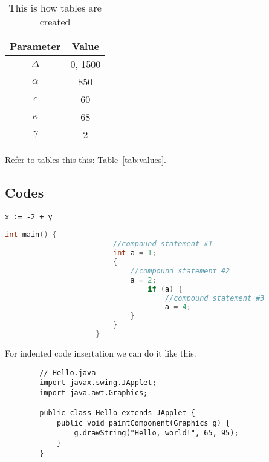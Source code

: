     \begin{table}[H] \center
    \begin{tabular}{c|c}
    Parameter & Value \\ \hline \hline
    $\Delta$ & 0, 1500 \\
    ${\alpha}$ & 850 \\
    ${\epsilon}$ & 60 \\
    ${\kappa}$ & 68 \\
    ${\gamma}$ & 2
    \end{tabular}
    \caption{This is how tables are created}
    \end{table}


    Refer to tables this this: Table~\ref{tab:values}.

    \subsection{Codes}

    \begin{lstlisting}[caption={My Captions},captionpos=b]
        x := -2 + y

        \end{lstlisting}

    \begin{lstlisting}[language=C,caption={[short caption]caption text}, captionpos=b]
                     int main() {
                         //compound statement #1
                         int a = 1;
                         {
                             //compound statement #2
                             a = 2;
                                 if (a) {
                                     //compound statement #3
                                     a = 4;
                             }
                         }
                     }

            \end{lstlisting}

    For indented code insertation we can do it like this.
    \begin{verbatim}
        // Hello.java
        import javax.swing.JApplet;
        import java.awt.Graphics;

        public class Hello extends JApplet {
            public void paintComponent(Graphics g) {
                g.drawString("Hello, world!", 65, 95);
            }
        }

        \end{verbatim}

